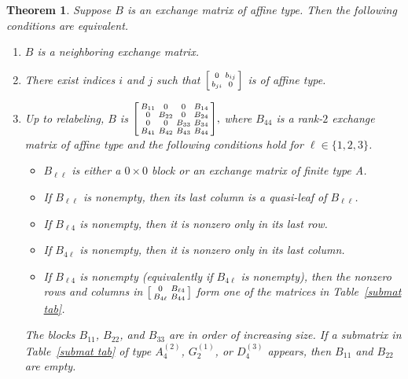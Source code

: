 \documentclass{amsart}
\newtheorem{theorem}[proposition]{Theorem}
\theoremstyle{definition}
\theoremstyle{remark}
\numberwithin{equation}{section}
\newcommand{\set}[1]{{\lbrace #1 \rbrace}}
\newcommand{\0}{{\mathbf{0}}}
\renewcommand{\b}{\mathbf{b}}
\begin{document}
\begin{theorem}\label{neigh B}
Suppose $B$ is an exchange matrix of affine type.
Then the following conditions are equivalent.
\begin{enumerate}[label=\rm(\roman*), ref=(\roman*)]
\item \label{neigh}
$B$ is a neighboring exchange matrix.
\item \label{aff 2}
There exist indices $i$ and $j$ such that $\begin{bsmallmatrix}0&b_{ij}\\b_{ji}&0\end{bsmallmatrix}$ is of affine type.
\item \label{neigh detailed}
Up to relabeling, $B$ is
    $
      \begin{bsmallmatrix}
        B_{11} 	& 0 		& 0 		& B_{14} \\ 
        0 		& B_{22} 	& 0 		& B_{24} \\
        0 		& 0 		& B_{33} 	& B_{34} \\
        B_{41} 	& B_{42} 	& B_{43} 	& B_{44}
      \end{bsmallmatrix},
    $ 
where $B_{44}$ is a rank-$2$ exchange matrix of affine type and the following conditions hold for ${\ell\in\set{1,2,3}}$.
\begin{itemize}
\item
$B_{\ell\ell}$ is either a $0\times0$ block or an exchange matrix of finite type A. %
\item
If $B_{\ell\ell}$ is nonempty, then its last column is a quasi-leaf of $B_{\ell\ell}$.
\item
If $B_{\ell4}$ is nonempty, then it is nonzero only in its last row.
\item
If $B_{4\ell}$ is nonempty, then it is nonzero only in its last column.
\item
If $B_{\ell4}$ is nonempty (equivalently if $B_{4\ell}$ is nonempty), then the nonzero rows and columns in $\begin{bsmallmatrix} 0 & B_{\ell4} \\ B_{4\ell} & B_{44} \end{bsmallmatrix}$ form one of the matrices in Table~\ref{submat tab}.
\end{itemize}
The blocks $B_{11}$, $B_{22}$, and $B_{33}$ are in order of increasing size. 
If a submatrix in Table~\ref{submat tab} of type $A_{4}^{(2)}$, $G_{2}^{(1)}$, or $D_{4}^{(3)}$ appears, then $B_{11}$ and $B_{22}$ are empty.
\end{enumerate}
\end{theorem}
\end{document}
